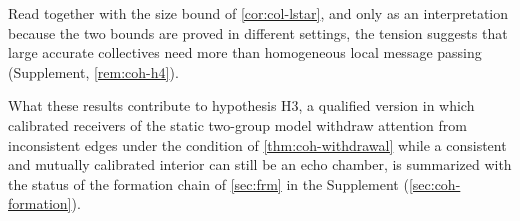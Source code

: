 Read together with the size bound of \cref{cor:col-lstar}, and only as an interpretation because the two bounds are proved in different settings, the tension suggests that large accurate collectives need more than homogeneous local message passing (Supplement, \cref{rem:coh-h4}).

What these results contribute to hypothesis H3, a qualified version in which calibrated receivers of the static two-group model withdraw attention from inconsistent edges under the condition of \cref{thm:coh-withdrawal} while a consistent and mutually calibrated interior can still be an echo chamber, is summarized with the status of the formation chain of \cref{sec:frm} in the Supplement (\cref{sec:coh-formation}).
